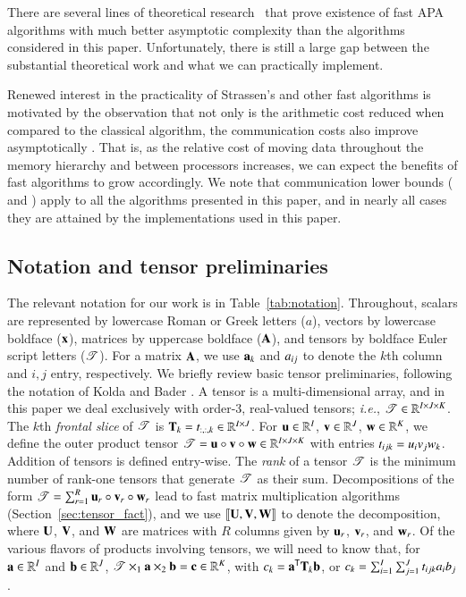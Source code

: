 \documentclass[preprint]{sigplanconf}
\newcommand{\Tra}{{\sf T}}
\newcommand{\Real}{\mathbb{R}}
\newcommand{\V}[2][]{{\bm{#1\mathbf{\MakeLowercase{#2}}}}}
\newcommand{\VE}[3][]{#1{\MakeLowercase{#2}}_{#3}}
\newcommand{\M}[2][]{{\bm{#1\mathbf{\MakeUppercase{#2}}}}}
\newcommand{\MC}[3][]{\V[#1]{#2}_{#3}}
\newcommand{\ME}[3][]{#1{\MakeLowercase{#2}}_{#3}}
\newcommand{\T}[2][]{\boldsymbol{#1\mathscr{\MakeUppercase{#2}}}}
\newcommand{\TS}[3][]{\M[#1]{#2}_{#3}}
\newcommand{\TE}[3][]{#1{\MakeLowercase{#2}}_{#3}}
\newcommand{\Oprod}{\circ}
\begin{document}
There are several lines of theoretical research~\cite{coppersmith1990matrix, stothers2010complexity, williams2012multiplying} that prove existence of fast APA algorithms with much better asymptotic complexity than the algorithms considered in this paper.
Unfortunately, there is still a large gap between the substantial theoretical work and what we can practically implement.

Renewed interest in the practicality of Strassen's and other fast algorithms is motivated by the observation that not only is the arithmetic cost reduced when compared to the classical algorithm, the communication costs also improve asymptotically \cite{ballard2012graph}.
That is, as the relative cost of moving data throughout the memory hierarchy and between processors increases, we can expect the benefits of fast algorithms to grow accordingly.
We note that communication lower bounds (\cite[Theorem 1.4]{ballard2012graph} and \cite[Theorem 1]{BDHLS12-RECT}) apply to all the algorithms presented in this paper, and in nearly all cases they are attained by the implementations used in this paper.

\subsection{Notation and tensor preliminaries}

The relevant notation for our work is in Table~\ref{tab:notation}.
Throughout, scalars are represented by lowercase Roman or Greek letters ($a$), vectors by lowercase boldface ($\V{x}$),
matrices by uppercase boldface ($\M{A}$), and tensors by boldface Euler script letters ($\T{T}$).
For a matrix $\M{A}$, we use $\MC{A}{k}$ and $\ME{A}{ij}$ to denote the $k$th column and $i, j$ entry, respectively.
We briefly review basic tensor preliminaries, following the notation of Kolda and Bader \cite{kolda2009tensor}.
A tensor is a multi-dimensional array, and in this paper we deal exclusively with order-3, real-valued tensors; \emph{i.e.}, $\T{T} \in \Real^{I \times J \times K}$.
The $k$th \emph{frontal slice} of $\T{T}$ is $\TS{T}{k} = \TE{T}{:,:,k} \in \Real^{I \times J}$.
For $\V{u} \in \Real^I$, $\V{v} \in \Real^J$, $\V{w} \in \Real^K$, we define the outer product tensor
$\T{T} = \V{u} \Oprod \V{v} \Oprod \V{w} \in  \Real^{I \times J \times K}$ with entries $\TE{T}{ijk} = \VE{u}{i}\VE{v}{j}\VE{w}{k}$.
Addition of tensors is defined entry-wise.
The \emph{rank} of a tensor $\T{T}$ is the minimum number of rank-one tensors that generate $\T{T}$ as their sum.
Decompositions of the form $\T{T} = \sum_{r=1}^{R}\V{u}_r \Oprod \V{v}_r \Oprod \V{w}_r$ lead to fast matrix multiplication algorithms (Section~\ref{sec:tensor_fact}), and we use $\alg{\M{U}}{\M{V}}{\M{W}}$ to denote the decomposition, where $\M{U}$, $\M{V}$, and $\M{W}$ are matrices with $R$ columns given by $\V{u}_r$, $\V{v}_r$, and $\V{w}_r$.
Of the various flavors of products involving tensors, we will need to know that, for $\V{a} \in \Real^{I}$ and $\V{b} \in \Real^{J}$,
$\T{T} \times_{1} \V{a} \times_{2} \V{b} = \V{c} \in \Real^{K}$, with $\VE{c}{k}=\V{a}^{\Tra}\TS{T}{k}\V{b}$, or $\VE{c}{k}=\sum_{i=1}^I\sum_{j=1}^J \TE{T}{ijk}\VE{a}{i}\VE{b}{j}$.
\end{document}
